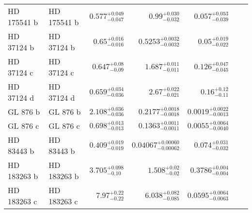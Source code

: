 \begin{longtable*}{llrrrrr}
HD 175541 b & HD 175541 b & $0.577^{+0.049}_{-0.047}$ & $0.99^{+0.030}_{-0.032}$ & $0.057^{+0.053}_{-0.039}$ & \cite{Johnson07} & \\
HD 37124 b & HD 37124 b & $0.65^{+0.016}_{-0.016}$ & $0.5253^{+0.0032}_{-0.0032}$ & $0.05^{+0.019}_{-0.022}$ & \cite{Butler03} & \\
HD 37124 c & HD 37124 c & $0.647^{+0.08}_{-0.09}$ & $1.687^{+0.011}_{-0.011}$ & $0.126^{+0.047}_{-0.045}$ & \cite{Butler03} & \\
HD 37124 d & HD 37124 d & $0.659^{+0.034}_{-0.036}$ & $2.67^{+0.022}_{-0.021}$ & $0.16^{+0.12}_{-0.11}$ & \cite{Vogt05} & \\
GL 876 b & GL 876 b & $2.108^{+0.036}_{-0.036}$ & $0.2177^{+0.0018}_{-0.0018}$ & $0.0019^{+0.0022}_{-0.0013}$ & \cite{Marcy98} & \\
GL 876 c & GL 876 c & $0.698^{+0.013}_{-0.013}$ & $0.1363^{+0.0011}_{-0.0011}$ & $0.0055^{+0.0064}_{-0.0040}$ & \cite{Marcy01} & \\
HD 83443 b & HD 83443 b & $0.409^{+0.019}_{-0.019}$ & $0.04067^{+0.00060}_{-0.00062}$ & $0.074^{+0.031}_{-0.032}$ & \cite{Butler02} & \\
HD 183263 b & HD 183263 b & $3.705^{+0.098}_{-0.10}$ & $1.508^{+0.02}_{-0.02}$ & $0.3786^{+0.004}_{-0.004}$ & \cite{Marcy05} & \\
HD 183263 c & HD 183263 c & $7.97^{+0.22}_{-0.22}$ & $6.038^{+0.082}_{-0.085}$ & $0.0595^{+0.0064}_{-0.0063}$ & \cite{Wright09} & \\
\bottomrule
\end{longtable*}
